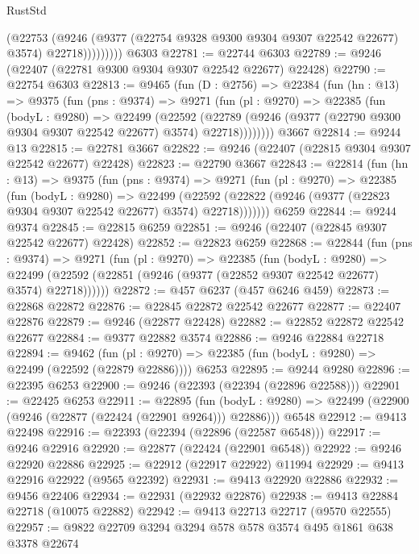 \begin{lexlean}{RustStd}
\begin{coremodule}
{\begin{coremodule}
{{{{{{{{{{{{{{{{{{{{{{{{{{{{{{{{{                  (@22753
                    (@9246
                      (@9377 (@22754 @9328 @9300 @9304 @9307 @22542 @22677) @3574)
                      @22718)))))))))
    @6303
@22781 := @22744 @6303
@22789 := @9246 (@22407 (@22781 @9300 @9304 @9307 @22542 @22677) @22428)
@22790 := @22754 @6303
@22813 := @9465
    (fun (D : @2756) =>
    @22384
      (fun (hn : @13) =>
      @9375
        (fun (pns : @9374) =>
        @9271
          (fun (pl : @9270) =>
          @22385
            (fun (bodyL : @9280) =>
            @22499
              (@22592
                (@22789 (@9246 (@9377 (@22790 @9300 @9304 @9307 @22542 @22677) @3574) @22718))))))))
    @3667
@22814 := @9244 @13
@22815 := @22781 @3667
@22822 := @9246 (@22407 (@22815 @9304 @9307 @22542 @22677) @22428)
@22823 := @22790 @3667
@22843 := @22814
    (fun (hn : @13) =>
    @9375
      (fun (pns : @9374) =>
      @9271
        (fun (pl : @9270) =>
        @22385
          (fun (bodyL : @9280) =>
          @22499
            (@22592 (@22822 (@9246 (@9377 (@22823 @9304 @9307 @22542 @22677) @3574) @22718)))))))
    @6259
@22844 := @9244 @9374
@22845 := @22815 @6259
@22851 := @9246 (@22407 (@22845 @9307 @22542 @22677) @22428)
@22852 := @22823 @6259
@22868 := @22844
    (fun (pns : @9374) =>
    @9271
      (fun (pl : @9270) =>
      @22385
        (fun (bodyL : @9280) =>
        @22499 (@22592 (@22851 (@9246 (@9377 (@22852 @9307 @22542 @22677) @3574) @22718))))))
@22872 := @457 @6237 (@457 @6246 @459)
@22873 := @22868 @22872
@22876 := @22845 @22872 @22542 @22677
@22877 := @22407 @22876
@22879 := @9246 (@22877 @22428)
@22882 := @22852 @22872 @22542 @22677
@22884 := @9377 @22882 @3574
@22886 := @9246 @22884 @22718
@22894 := @9462
    (fun (pl : @9270) => @22385 (fun (bodyL : @9280) => @22499 (@22592 (@22879 @22886))))
    @6253
@22895 := @9244 @9280
@22896 := @22395 @6253
@22900 := @9246 (@22393 (@22394 (@22896 @22588)))
@22901 := @22425 @6253
@22911 := @22895
    (fun (bodyL : @9280) => @22499 (@22900 (@9246 (@22877 (@22424 (@22901 @9264))) @22886)))
    @6548
@22912 := @9413 @22498
@22916 := @22393 (@22394 (@22896 (@22587 @6548)))
@22917 := @9246 @22916
@22920 := @22877 (@22424 (@22901 @6548))
@22922 := @9246 @22920 @22886
@22925 := @22912 (@22917 @22922) @11994
@22929 := @9413 @22916 @22922 (@9565 @22392)
@22931 := @9413 @22920 @22886
@22932 := @9456 @22406
@22934 := @22931 (@22932 @22876)
@22938 := @9413 @22884 @22718 (@10075 @22882)
@22942 := @9413 @22713 @22717 (@9570 @22555)
@22957 := @9822
    @22709
    @3294
    @3294
    @578
    @578
    @3574
    @495
    @1861
    @638
    @3378
    @22674
}}}}}}}}}}}}}}}}}}}}}}}}}}}}}}}}}
\end{coremodule}}
\end{coremodule}
\end{lexlean}
